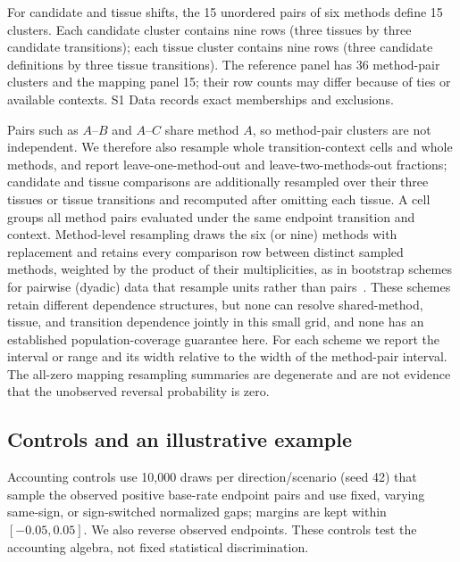 \documentclass[10pt,letterpaper]{article}
\begin{document}
For candidate and tissue shifts, the 15 unordered pairs of six methods define 15 clusters. Each candidate cluster contains nine rows (three tissues by three candidate transitions); each tissue cluster contains nine rows (three candidate definitions by three tissue transitions). The reference panel has 36 method-pair clusters and the mapping panel 15; their row counts may differ because of ties or available contexts. S1 Data records exact memberships and exclusions.

Pairs such as $A$--$B$ and $A$--$C$ share method $A$, so method-pair clusters are not independent. We therefore also resample whole transition-context cells and whole methods, and report leave-one-method-out and leave-two-methods-out fractions; candidate and tissue comparisons are additionally resampled over their three tissues or tissue transitions and recomputed after omitting each tissue. A cell groups all method pairs evaluated under the same endpoint transition and context. Method-level resampling draws the six (or nine) methods with replacement and retains every comparison row between distinct sampled methods, weighted by the product of their multiplicities, as in bootstrap schemes for pairwise (dyadic) data that resample units rather than pairs~\cite{davezies2021exchangeable}. These schemes retain different dependence structures, but none can resolve shared-method, tissue, and transition dependence jointly in this small grid, and none has an established population-coverage guarantee here. For each scheme we report the interval or range and its width relative to the width of the method-pair interval. The all-zero mapping resampling summaries are degenerate and are not evidence that the unobserved reversal probability is zero.

\subsection*{Controls and an illustrative example}
Accounting controls use 10{,}000 draws per direction/scenario (seed 42) that sample the observed positive base-rate endpoint pairs and use fixed, varying same-sign, or sign-switched normalized gaps; margins are kept within $[-0.05,0.05]$. We also reverse observed endpoints. These controls test the accounting algebra, not fixed statistical discrimination.
\end{document}
